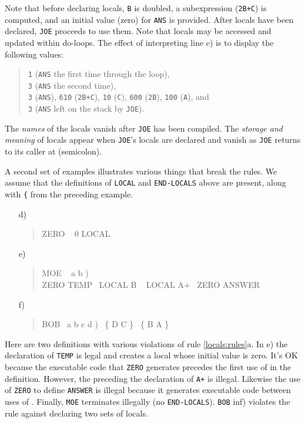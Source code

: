 \begin{intro}
Note that before declaring locals, \texttt{B} is doubled, a
subexpression (\texttt{2B+C}) is computed, and an initial value (zero)
for \texttt{ANS} is provided. After locals have been declared,
\texttt{JOE} proceeds to use them. Note that locals may be accessed and
updated within do-loops. The effect of interpreting line c) is to
display the following values:

\begin{quote}
	\texttt{1} (\texttt{ANS} the first time through the loop),\\
	\texttt{3} (\texttt{ANS} the second time), \\
	\texttt{3} (\texttt{ANS}),
		\texttt{610} (\texttt{2B+C}),
		\texttt{10}  (\texttt{C}),
		\texttt{600} (\texttt{2B}),
		\texttt{100} (\texttt{A}), and \\
	\texttt{3} (\texttt{ANS} left on the stack by \texttt{JOE}).
\end{quote}

The \emph{names} of the locals vanish after \texttt{JOE} has been
compiled. The \emph{storage and meaning} of locals appear when
\texttt{JOE}'s locals are declared and vanish as \texttt{JOE} returns
to its caller at \word{;} (semicolon).

A second set of examples illustrates various things that break the
rules. We assume that the definitions of \texttt{LOCAL} and
\texttt{END-LOCALS} above are present, along with \texttt{\{} from
the preceding example.

\begin{enumerate}
\item[d)] \begin{quote}\ttfamily
	\word{:} ZERO ~ 0    LOCAL
	\word{;} 
	\end{quote}

\item[e)] \begin{quote}\ttfamily
	\word{:} MOE ~ a b ) \\
	\tab ZERO TEMP ~LOCAL B ~ LOCAL A+ ~ZERO ANSWER \word{;}
	\end{quote}

\item[f)] \begin{quote}\ttfamily
	\word{:} BOB~  a b c d ) ~\{ D C \} ~\{ B A \} \word{;}
	\end{quote}
\end{enumerate}

Here are two definitions with various violations of rule
\ref{locals:rules}a. In e) the declaration of \texttt{TEMP} is legal
and creates a local whose initial value is zero. It's OK because the
executable code that \texttt{ZERO} generates precedes the first use of
 in the definition. However, the 
preceding the declaration of \texttt{A+} is illegal. Likewise the use
of \texttt{ZERO} to define \texttt{ANSWER} is illegal because it
generates executable code between uses of .
Finally, \texttt{MOE} terminates illegally (no \texttt{END-LOCALS}).
\texttt{BOB} inf) violates the rule against declaring two sets of
locals.


\end{intro}
